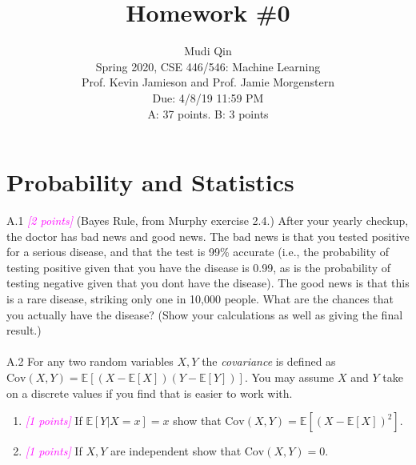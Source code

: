 \documentclass{article}
\date{{}}
\newcommand{\1}{\mathbf{1}}
\newcommand{\E}{\mathbb{E}}
\newcommand{\points}[1]{\small\textcolor{magenta}{\emph{[#1 points]}} \normalsize}
\begin{document}
\title{Homework \#0}
\author{\normalsize{Mudi Qin}\\
\normalsize{Spring 2020, CSE 446/546: Machine Learning}\\
\normalsize{Prof. Kevin Jamieson and Prof. Jamie Morgenstern} \\
\normalsize{Due: 4/8/19  11:59 PM}\\
\normalsize{A: 37 points. B: 3 points}}
\maketitle


\section*{Probability and Statistics}
A.1 \points{2} (Bayes Rule, from Murphy exercise 2.4.) After your yearly checkup, the doctor has bad news and good news. The bad news is that you tested positive for a serious disease, and that the test is 99\% accurate (i.e., the probability of testing positive given that you have the disease is 0.99, as is the probability of testing negative given that you dont have the disease). The good news is that this is a rare disease, striking only one in 10,000 people. What are the chances that you actually have the disease? (Show your calculations as well as giving the final result.)\\

\noindent{}\\

A.2 For any two random variables $X,Y$ the \emph{covariance} is
  defined as
  $\text{Cov}(X,Y)=\E[(X-\E[X])(Y-\E[Y])]$. You may assume $X$ and $Y$
  take on a discrete values if you find that is easier to work with.
\begin{enumerate}
\item \points{1} If $\E[Y|X=x] = x$ show that $\text{Cov}(X,Y) = \E[(X-\E[X])^2]$.  
\item \points{1} If $X,Y$ are independent show that $\text{Cov}(X,Y)=0$.
\end{enumerate}
\end{document}
